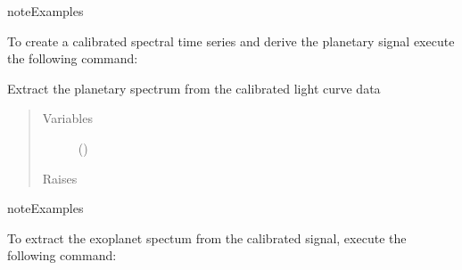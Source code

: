 \documentclass[a4paper,10pt,english]{sphinxmanual}
\begin{document}
\begin{fulllineitems}
\begin{fulllineitems}
\begin{quote}
\begin{description}
\end{description}\end{quote}

\begin{sphinxadmonition}{note}{Examples}

To create a calibrated spectral time series and derive the
planetary signal execute the following command:

%
\begin{sphinxVerbatim}[commandchars=\\\{\}]
\end{sphinxVerbatim}
\end{sphinxadmonition}

\end{fulllineitems}


\begin{fulllineitems}
\label{\detokenize{cascade.TSO:cascade.TSO.TSO.TSOSuite.extract_spectrum}}
Extract the planetary spectrum from the calibrated light curve data
\begin{quote}\begin{description}
\item[{Variables}] \leavevmode
{} () \textendash{} 

\item[{Raises}] \leavevmode
{}

\end{description}\end{quote}

\begin{sphinxadmonition}{note}{Examples}

To extract the exoplanet spectum from the calibrated signal,
execute the following command:

%
\begin{sphinxVerbatim}[commandchars=\\\{\}]
\end{sphinxVerbatim}
\end{sphinxadmonition}


\end{fulllineitems}
\end{fulllineitems}
\end{document}
